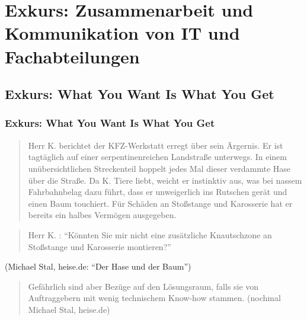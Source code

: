 \section{Exkurs: Zusammenarbeit und Kommunikation von IT und Fachabteilungen}
\subsection{Exkurs: What You Want Is What You Get}
   
    \begin{frame}
      \frametitle<beamer>{Exkurs: What You Want Is What You Get}
      \begin{quote}
        Herr K. berichtet der KFZ-Werkstatt erregt über sein Ärgernis. Er ist tagtäglich auf einer serpentinenreichen Landstraße unterwegs. In einem unübersichtlichen Streckenteil hoppelt jedes Mal dieser verdammte Hase über die Straße. Da K. Tiere liebt, weicht er instinktiv aus, was bei nassem Fahrbahnbelag dazu führt, dass er unweigerlich ins Rutschen gerät und einen Baum touchiert. Für Schäden an Stoßstange und Karosserie hat er bereits ein halbes Vermögen ausgegeben.
      \end{quote}
    \end{frame}
    \begin{frame}
      \begin{quote}
        Herr K. : ``Könnten Sie mir nicht eine zusätzliche Knautschzone an Stoßstange und Karosserie montieren?''
      \end{quote}
      \hfill (Michael Stal, heise.de: ``Der Hase und der Baum'')
    \end{frame}
    

    \begin{frame}
      \begin{quote}
        Gefährlich sind aber Bezüge auf den Lösungsraum, falls sie von Auftraggebern mit wenig technischem Know-how stammen. \hfill (nochmal Michael Stal, heise.de)
      \end{quote}
    \end{frame}

